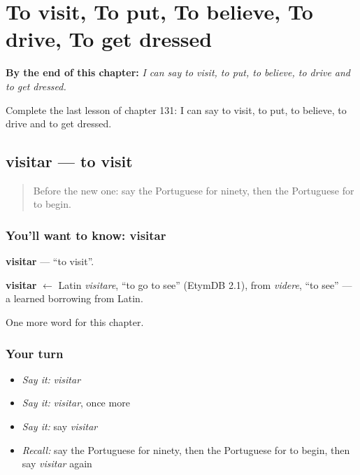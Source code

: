 
\chapter{To visit, To put, To believe, To drive, To get dressed}
\label{ch:pt-to-visit-to-put-to-believe-to-drive-to-get-dressed}

\begin{chapteropening}
\textbf{By the end of this chapter:} \emph{I can say to visit, to put, to believe, to drive and to get dressed.}

Complete the last lesson of chapter 131: I can say to visit, to put, to believe, to drive and to get dressed.
\end{chapteropening}

\section[visitar]{visitar — to visit}

\label{lesson:PT-C131-visitar}



\begin{quote}
Before the new one: say the Portuguese for ninety, then the Portuguese for to begin.
\end{quote}

\subsection*{You'll want to know: visitar}
\textbf{visitar} — \textquotedblleft{}to visit\textquotedblright{}.

\begin{cousinweb}
\textbf{visitar} $\leftarrow$ Latin \emph{visitare}, \textquotedblleft{}to go to see\textquotedblright{} (EtymDB 2.1), from \emph{videre}, \textquotedblleft{}to see\textquotedblright{} — a learned borrowing from Latin.
\end{cousinweb}

\begin{grammarlens}[title={What you've built}]
One more word for this chapter.
\end{grammarlens}

\subsection*{Your turn}
\begin{itemize}
\raggedright
  \item \emph{Say it:} \emph{visitar}
  \item \emph{Say it:} \emph{visitar}, once more
  \item \emph{Say it:} say \emph{visitar}
  \item \emph{Recall:} say the Portuguese for ninety, then the Portuguese for to begin, then say \emph{visitar} again
\end{itemize}

